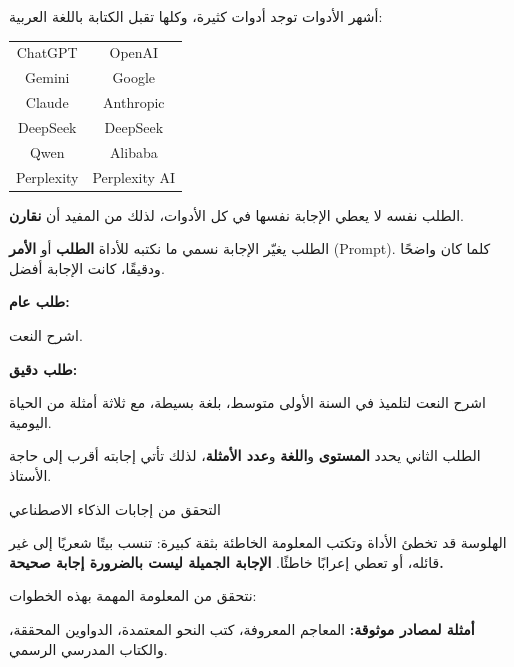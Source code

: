 \documentclass[aspectratio=169, 11pt, xcolor={table}]{beamer}
\begin{document}
\begin{frame}{أشهر الأدوات}
    توجد أدوات كثيرة، وكلها تقبل الكتابة باللغة العربية:
    \begin{center}
        \begin{tabularx}{0.6\textwidth}{|C|C|}
            \hline
             &  \\
            \hline
            \textenglish{ChatGPT}    & \textenglish{OpenAI} \\ \hline
            \textenglish{Gemini}     & \textenglish{Google} \\ \hline
            \textenglish{Claude}     & \textenglish{Anthropic} \\ \hline
            \textenglish{DeepSeek}   & \textenglish{DeepSeek} \\ \hline
            \textenglish{Qwen}       & \textenglish{Alibaba} \\ \hline
            \textenglish{Perplexity} & \textenglish{Perplexity AI} \\ \hline
        \end{tabularx}
    \end{center}
    الطلب نفسه لا يعطي الإجابة نفسها في كل الأدوات، لذلك من المفيد أن \textbf{نقارن}.
\end{frame}

\begin{frame}{الطلب يغيّر الإجابة}
    نسمي ما نكتبه للأداة \textbf{الطلب} أو \textbf{الأمر} \textenglish{(Prompt)}.
    كلما كان واضحًا ودقيقًا، كانت الإجابة أفضل.

    \vspace{2mm}
    \textbf{\color{brandOrange}طلب عام:}
    \begin{amr}[brandOrange]
        اشرح النعت.
    \end{amr}
    \textbf{\color{tealDeep}طلب دقيق:}
    \begin{amr}[brandTeal]
        اشرح النعت لتلميذ في السنة الأولى متوسط،
        بلغة بسيطة، مع ثلاثة أمثلة من الحياة اليومية.
    \end{amr}
    الطلب الثاني يحدد \textbf{المستوى} و\textbf{اللغة} و\textbf{عدد الأمثلة}،
    لذلك تأتي إجابته أقرب إلى حاجة الأستاذ.
\end{frame}

\begin{frame}{التحقق من إجابات الذكاء الاصطناعي}
    \begin{obox}{\faExclamationTriangle\quad الهلوسة}
        قد تخطئ الأداة وتكتب المعلومة الخاطئة بثقة كبيرة:
        تنسب بيتًا شعريًا إلى غير قائله، أو تعطي إعرابًا خاطئًا.
        \textbf{الإجابة الجميلة ليست بالضرورة إجابة صحيحة.}
    \end{obox}
    نتحقق من المعلومة المهمة بهذه الخطوات:
    \begin{center}
    \end{center}
    \textbf{أمثلة لمصادر موثوقة:} المعاجم المعروفة، كتب النحو المعتمدة،
    الدواوين المحققة، والكتاب المدرسي الرسمي.
\end{frame}
\end{document}

